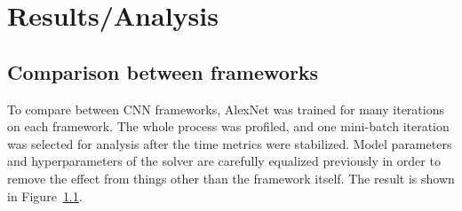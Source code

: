 \section{Results/Analysis}

\subsection{Comparison between frameworks}
To compare between CNN frameworks, AlexNet was trained for many iterations on each framework.
The whole process was profiled, and one mini-batch iteration was selected for analysis after the time metrics were stabilized.
Model parameters and hyperparameters of the solver are carefully equalized previously in order to remove the effect from things other than the framework itself.
The result is shown in Figure~\ref{}.

